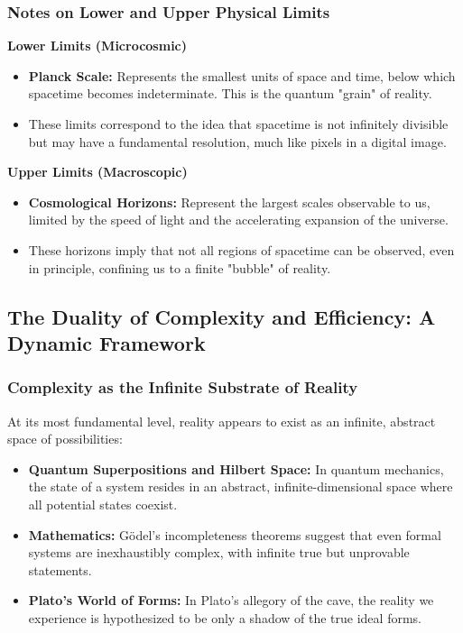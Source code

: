 \documentclass[12pt]{article}
\begin{document}
\subsubsection{Notes on Lower and Upper Physical Limits}

\textbf{Lower Limits (Microcosmic)}

\begin{itemize}
    \item \textbf{Planck Scale:} Represents the smallest units of space and time, below which spacetime becomes indeterminate. This is the quantum "grain" of reality.
    \item These limits correspond to the idea that spacetime is not infinitely divisible but may have a fundamental resolution, much like pixels in a digital image.
\end{itemize}

\textbf{Upper Limits (Macroscopic)}

\begin{itemize}
    \item \textbf{Cosmological Horizons:} Represent the largest scales observable to us, limited by the speed of light and the accelerating expansion of the universe.
    \item These horizons imply that not all regions of spacetime can be observed, even in principle, confining us to a finite "bubble" of reality.
\end{itemize}

\subsection{The Duality of Complexity and Efficiency: A Dynamic Framework}

\subsubsection{Complexity as the Infinite Substrate of Reality}

At its most fundamental level, reality appears to exist as an infinite, abstract space of possibilities:
\begin{itemize}
    \item \textbf{Quantum Superpositions and Hilbert Space:} In quantum mechanics, the state of a system resides in an abstract, infinite-dimensional space where all potential states coexist.
    \item \textbf{Mathematics:} Gödel's incompleteness theorems suggest that even formal systems are inexhaustibly complex, with infinite true but unprovable statements.
    \item \textbf{Plato's World of Forms:} In Plato's allegory of the cave, the reality we experience is hypothesized to be only a shadow of the true ideal forms.
\end{itemize}
\end{document}
